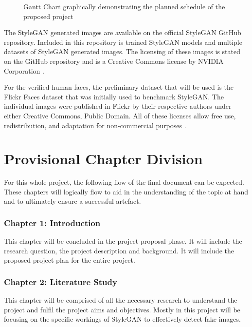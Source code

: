 \begin{figure}[H]%
\centering
{}%
\caption{Gantt Chart graphically demonstrating the planned schedule of the proposed project}%
\label{fig:fliek}%
\end{figure}

The StyleGAN generated images are available on the official StyleGAN GitHub repository. Included in this repository is trained StyleGAN models and multiple datasets of StyleGAN generated images. The licensing of these images is stated on the GitHub repository and is a Creative Commons license by NVIDIA Corporation \citep{Karras2019}. 

For the verified human faces, the preliminary dataset that will be used is the Flickr Faces dataset that was initially used to benchmark StyleGAN. The individual images were published in Flickr by their respective authors under either Creative Commons, Public Domain. All of these licenses allow free use, redistribution, and adaptation for non-commercial purposes \citep{Karras2019}.

\section{Provisional Chapter Division}

For this whole project, the following flow of the final document can be expected. These chapters will logically flow to aid in the understanding of the topic at hand and to ultimately ensure a successful artefact.

\subsubsection*{Chapter 1: Introduction}
This chapter will be concluded in the project proposal phase. It will include the research question, the project description and background. It will include the proposed project plan for the entire project.

\subsubsection*{Chapter 2: Literature Study}
This chapter will be comprised of all the necessary research to understand the project and fulfil the project aims and objectives. Mostly in this project will be focusing on the specific workings of StyleGAN to effectively detect fake images.

